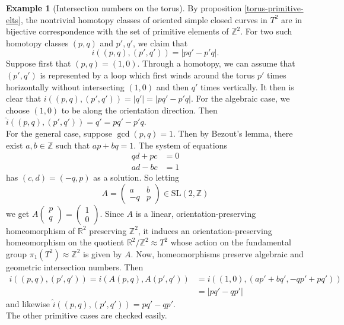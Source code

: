 \documentclass[reqno]{amsart}
\theoremstyle{definition}
\newtheorem{example}[theorem]{Example}
\theoremstyle{remark}
\newcommand{\SL}{{\mathrm{SL}}}
\begin{document}
\begin{example}[Intersection numbers on the torus]
    By proposition \ref{torus-primitive-elts}, the nontrivial
    homotopy classes of oriented simple closed curves in
    $T^2$ are in bijective correspondence with the
    set of primitive elements of 
    $\mathbb{Z}^2$.
    For two such homotopy classes
    $\left( p,q \right) $ and $p', q'$, we claim that
    \[
    i \left( \left( p,q \right) , \left( p',q' \right)  \right) 
    = \left| pq' - p'q \right| .
    \] 
    Suppose first that $\left( p,q \right) =(1,0)$. Through a
    homotopy, we can assume that $\left( p',q' \right) $ is
    represented by a loop which first winds around the
    torus $p'$ times horizontally without
    intersecting $(1,0)$ and then $q'$ times vertically. 
    It then is clear that
    $i \left( \left( p,q \right) , \left( p',q' \right)  \right) 
    = \left| q' \right| = \left| pq' - p'q \right| $.
    For the algebraic case, we choose $\left( 1,0 \right) $ 
    to be along the orientation direction. Then
    $\hat{i} \left( \left( p,q \right) , \left( p',q' \right) 
    \right) = q' = pq' - p'q$.\\
    For the general case, suppose
    $\gcd (p,q) = 1$. Then by Bezout's lemma, there
    exist $a,b \in \mathbb{Z}$ such that
    $ap + bq = 1$. The system of equations
    \begin{align*}
        qd + pc &= 0\\
        ad - bc &= 1
    \end{align*}
    has $\left( c,d \right) = \left( -q,p \right) $ as a solution.
    So letting
    \[
    A =
    \begin{pmatrix} a & b \\ -q & p \end{pmatrix} \in 
    \SL \left( 2, \mathbb{Z} \right) 
    \] 
    we get $A \begin{pmatrix} p \\ q \end{pmatrix} 
    = \begin{pmatrix} 1 \\ 0 \end{pmatrix} $.
    Since $A$ is a linear, orientation-preserving
    homeomorphism of $\mathbb{R}^2$ preserving
    $\mathbb{Z}^2$, it induces
    an orientation-preserving homeomorphism
    on the quotient $\mathbb{R}^2 / \mathbb{Z}^2
    \approx T^2$ whose action on
    the fundamental group $\pi_1 \left( T^2 \right) 
    \approx \mathbb{Z}^2$ is given by $A$.
    Now, homeomorphisms preserve
    algebraic and 
    geometric intersection numbers.
    Then
    \begin{align*}
    i \left( \left( p,q \right) , \left( p',q' \right)  \right) 
    = i \left( A \left( p,q \right) , A\left( p',q' \right)  \right) 
    &= i \left( \left( 1,0 \right) , \left( ap'+bq',
    -qp' + pq'\right)  \right)\\
    &= \left| pq' - qp'
 \right|
    \end{align*}
    and likewise 
    $\hat{i}\left( \left( p,q \right) , \left( p',q' \right) 
    \right) = pq' - qp'$.\\
    The other primitive cases are checked easily.
\end{example}
\end{document}
